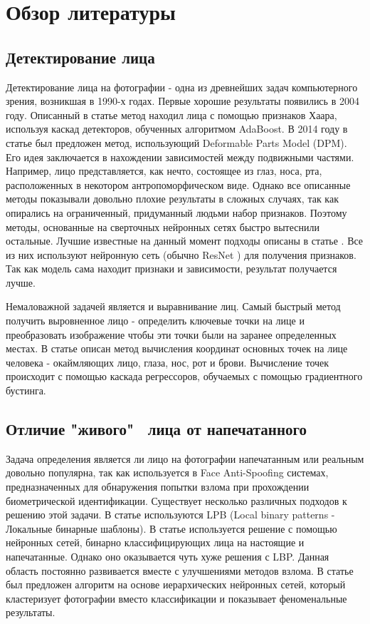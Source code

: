 \documentclass[a4paper,14pt]{extarticle}
\begin{document}
    \section{Обзор литературы}
    \subsection{Детектирование лица}
    Детектирование лица на фотографии - одна из древнейших задач компьютерного зрения, возникшая в 1990-х годах. Первые хорошие результаты появились в 2004 году. Описанный в статье \cite{face_detection} метод находил лица с помощью признаков Хаара, используя каскад детекторов, обученных алгоритмом AdaBoost. В 2014 году в статье \cite{face_detection2} был предложен метод, использующий Deformable Parts Model (DPM). Его идея заключается в нахождении зависимостей между подвижными частями. Например, лицо представляется, как нечто, состоящее из глаз, носа, рта, расположенных в некотором антропоморфическом виде. Однако все описанные методы показывали довольно плохие результаты в сложных случаях, так как опирались на ограниченный, придуманный людьми набор признаков. Поэтому методы, основанные на сверточных нейронных сетях быстро вытеснили остальные. Лучшие известные на данный момент подходы описаны в статье \cite{face_detection3}. Все из них используют нейронную сеть (обычно ResNet \cite{resnet}) для получения признаков. Так как модель сама находит признаки и зависимости, результат получается лучше.
    \par Немаловажной задачей является и выравнивание лиц. Самый быстрый метод получить выровненное лицо - определить ключевые точки на лице и преобразовать изображение чтобы эти точки были на заранее определенных местах. В статье \cite{align} описан метод вычисления координат основных точек на лице человека - окаймляющих лицо, глаза, нос, рот и брови. Вычисление точек происходит с помощью каскада регрессоров, обучаемых с помощью градиентного бустинга.
    \subsection{Отличие "живого" \, лица от напечатанного}
    Задача определения является ли лицо на фотографии напечатанным или реальным довольно популярна, так как используется в Face Anti-Spoofing системах, предназначенных для обнаружения попытки взлома при прохождении биометрической идентификации. Существует несколько различных подходов к решению этой задачи. В статье \cite{lbp} используются LPB (Local binary patterns - Локальные бинарные шаблоны). В статье \cite{lbp2} используется решение с помощью нейронных сетей, бинарно классифицирующих лица на настоящие и напечатанные. Однако оно оказывается чуть хуже решения с LBP. Данная область постоянно развивается вместе с улучшениями методов взлома. В статье \cite{lbp3} был предложен алгоритм на основе иерархических нейронных сетей, который кластеризует фотографии вместо классификации и показывает феноменальные результаты.
\end{document}
